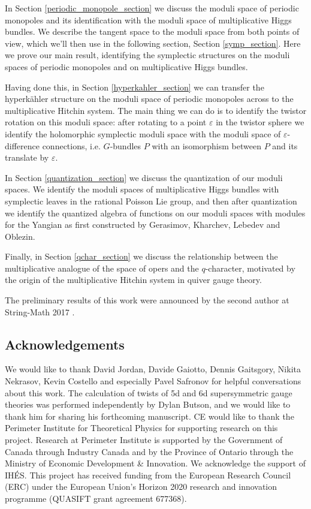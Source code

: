 \documentclass[11pt, oneside, reqno]{amsart}
\theoremstyle{definition} \newtheorem{definition}{Definition}[section]
\theoremstyle{definition} \newtheorem{remark}[definition]{Remark}
\theoremstyle{definition} \newtheorem{remarks}[definition]{Remarks}
\theoremstyle{definition} \newtheorem{question}[definition]{Question}
\theoremstyle{definition} \newtheorem*{note}{Note}
\theoremstyle{definition} \newtheorem{example}[definition]{Example}
\theoremstyle{definition} \newtheorem{examples}[definition]{Examples}
\newcommand{\eps}{\varepsilon}
\begin{document}
In Section \ref{periodic_monopole_section} we discuss the moduli space of periodic monopoles and its identification with the moduli space of multiplicative Higgs bundles.  We describe the tangent space to the moduli space from both points of view, which we'll then use in the following section, Section \ref{symp_section}.  Here we prove our main result, identifying the symplectic structures on the moduli spaces of periodic monopoles and on multiplicative Higgs bundles.

Having done this, in Section \ref{hyperkahler_section} we can transfer the hyperk\"ahler structure on the moduli space of periodic monopoles across to the multiplicative Hitchin system.  The main thing we can do is to identify the twistor rotation on this moduli space: after rotating to a point $\eps$ in the twistor sphere we identify the holomorphic symplectic moduli space with the moduli space of $\eps$-difference connections, i.e. $G$-bundles $P$ with an isomorphism between $P$ and its translate by $\eps$.

In Section \ref{quantization_section} we discuss the quantization of our moduli spaces.  We identify the moduli spaces of multiplicative Higgs bundles with symplectic leaves in the rational Poisson Lie group, and then after quantization we identify the quantized algebra of functions on our moduli spaces with modules for the Yangian as first constructed by Gerasimov, Kharchev, Lebedev and Oblezin. 

Finally, in Section \ref{qchar_section} we discuss the relationship between the multiplicative analogue of the space of opers and the $q$-character, motivated by the origin of the multiplicative Hitchin system in quiver gauge theory.

The preliminary results of this work were announced by the second author at String-Math 2017 \cite{PestunStringMath}.

\subsection{Acknowledgements}
We would like to thank David Jordan, Davide Gaiotto, Dennis Gaitsgory, Nikita Nekrasov, Kevin Costello and especially Pavel Safronov for helpful conversations about this work. The calculation of twists of 5d and 6d supersymmetric gauge theories was performed independently by Dylan Butson, and we would like to thank him for sharing his forthcoming manuscript. CE would like to thank the Perimeter Institute for Theoretical Physics for supporting research on this project. Research at Perimeter Institute is supported by the Government of Canada through Industry Canada and by the Province of Ontario through the Ministry of Economic Development \& Innovation. We acknowledge the support of IH\'ES.  This project has received funding from the European Research Council (ERC) under the European Union's Horizon 2020 research and innovation programme (QUASIFT grant agreement 677368).
\end{document}
